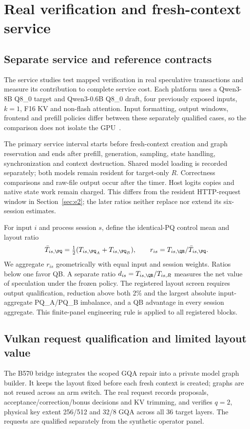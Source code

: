 \section{Real verification and fresh-context service}
\label{sec:service}
\subsection{Separate service and reference contracts}
The service studies test mapped verification in real speculative transactions and measure its contribution to complete service cost. Each platform uses a Qwen3-8B Q8\_0 target and Qwen3-0.6B Q8\_0 draft, four previously exposed inputs, $k=1$, F16 KV and non-flash attention. Input formatting, output windows, frontend and prefill policies differ between these separately qualified cases, so the comparison does not isolate the GPU~\cite{b570servicerecords,rtxservicerecords}.

The primary service interval starts before fresh-context creation and graph reservation and ends after prefill, generation, sampling, state handling, synchronization and context destruction. Shared model loading is recorded separately; both models remain resident for target-only $R$. Correctness comparisons and raw-file output occur after the timer. Host logits copies and native state work remain charged. This differs from the resident HTTP-request window in Section~\ref{sec:e2}; the later ratios neither replace nor extend its six-session estimates.

For input $i$ and process session $s$, define the identical-PQ control mean and layout ratio
\begin{equation}
\bar T_{is,\PQ}=\tfrac12(T_{is,\PQ_A}+T_{is,\PQ_B}),\qquad
r_{is}=T_{is,\QB}/\bar T_{is,\PQ}.
\label{eq:servicepair}
\end{equation}
We aggregate $r_{is}$ geometrically with equal input and session weights. Ratios below one favor QB. A separate ratio $d_{is}=T_{is,\QB}/T_{is,R}$ measures the net value of speculation under the frozen policy. The registered layout screen requires output qualification, reduction above both 2\% and the largest absolute input-aggregate PQ\_A/PQ\_B imbalance, and a QB advantage in every session aggregate. This finite-panel engineering rule is applied to all registered blocks.

\subsection{Vulkan request qualification and limited layout value}
The B570 bridge integrates the scoped GQA repair into a private model graph builder. It keeps the layout fixed before each fresh context is created; graphs are not reused across an arm switch. The real request records proposals, acceptance/correction/bonus decisions and KV trimming, and verifies $q=2$, physical key extent 256/512 and 32/8 GQA across all 36 target layers. The requests are qualified separately from the synthetic operator panel.

